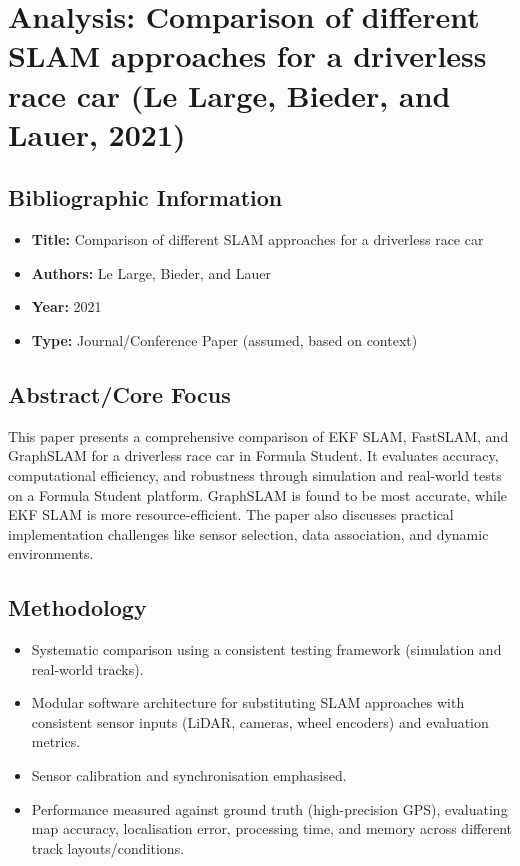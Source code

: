 \section{Analysis: Comparison of different SLAM approaches for a driverless race car (Le Large, Bieder, and Lauer, 2021)}\label{sec:le-large-bieder-lauer-2021}

\subsection{Bibliographic Information}\label{subsec:bibliographic-information2}
\begin{itemize}
    \item \textbf{Title:} Comparison of different SLAM approaches for a driverless race car
    \item \textbf{Authors:} Le Large, Bieder, and Lauer
    \item \textbf{Year:} 2021
    \item \textbf{Type:} Journal/Conference Paper (assumed, based on context)
\end{itemize}

\subsection{Abstract/Core Focus}\label{subsec:abstract/core-focus2}
This paper presents a comprehensive comparison of EKF SLAM, FastSLAM, and GraphSLAM for a driverless race car in Formula Student. It evaluates accuracy, computational efficiency, and robustness through simulation and real-world tests on a Formula Student platform. GraphSLAM is found to be most accurate, while EKF SLAM is more resource-efficient. The paper also discusses practical implementation challenges like sensor selection, data association, and dynamic environments.

\subsection{Methodology}\label{subsec:methodology}
\begin{itemize}
    \item Systematic comparison using a consistent testing framework (simulation and real-world tracks).
    \item Modular software architecture for substituting SLAM approaches with consistent sensor inputs (LiDAR, cameras, wheel encoders) and evaluation metrics.
    \item Sensor calibration and synchronisation emphasised.
    \item Performance measured against ground truth (high-precision GPS), evaluating map accuracy, localisation error, processing time, and memory across different track layouts/conditions.
\end{itemize}

